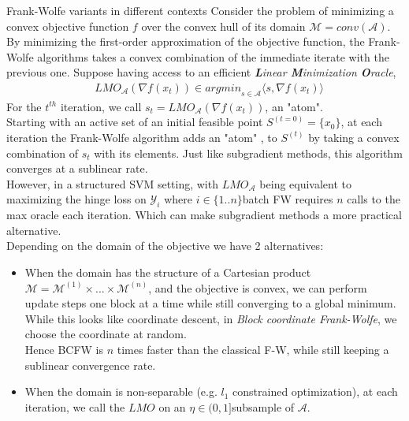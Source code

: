 \documentclass[final]{beamer}
\newlength{\colwidth}
\begin{document}
\begin{frame}[t]
\begin{columns}[t]
\begin{column}{\colwidth}
  \begin{block}{Frank-Wolfe variants in different contexts}
    Consider the problem of minimizing a convex objective function $f$ over the convex hull of its domain $\mathcal{M}= conv(\mathcal{A})$.\\
    By minimizing the first-order approximation of the objective function, the Frank-Wolfe algorithms takes a convex combination of the immediate iterate with the previous one. Suppose having access to an efficient \textit{\textbf{L}inear \textbf{M}inimization \textbf{O}racle},
    \begin{equation*}
    \begin{aligned}
        &LMO_{\mathcal{A}}(\nabla f(x_{t}))\in \textit{argmin}_{s\in\mathcal{A}}\langle s, \nabla f(x_{t})\rangle
    \end{aligned}    
    \end{equation*}
    For the $t^{th}$ iteration, we call $s_{t}= LMO_{\mathcal{A}}(\nabla f(x_{t}))$, an "atom".\\
    Starting with an active set of an initial feasible point $S^{(t=0)}= \{x_{0}\}$, at each iteration the Frank-Wolfe algorithm adds an "atom" , to $S^{(t)}$ by taking a convex combination of $s_{t}$ with its elements. Just like subgradient methods, this algorithm converges at a sublinear rate.\\
    However, in a structured SVM setting, with $LMO_{\mathcal{A}}$ being equivalent to maximizing the hinge loss on $\mathcal{Y}_{i}$ where $i\in\{1..n\}$\quad batch FW requires $n$ calls to the max oracle each iteration. Which can make subgradient methods a more practical alternative.\\
    Depending on the domain of the objective we have 2 alternatives:
    \begin{itemize}
      \item When the domain has the structure of a Cartesian product $\mathcal{M}=\mathcal{M}^{(1)}\times...\times\mathcal{M}^{(n)}$, and the objective is convex, we can perform update steps one block at a time while still converging to a global minimum.\\
     While this looks like coordinate descent, in \textit{Block coordinate Frank-Wolfe}, we choose the coordinate at random.\\
     Hence BCFW is $n$ times faster than the classical F-W, while still keeping a sublinear convergence rate.
      \item When the domain is non-separable (e.g. $l_{1}$ constrained optimization), at each iteration, we call the $LMO$ on an $\eta\in(0,1]$\quad subsample of $\mathcal{A}$.\\

\end{itemize}
\end{block}
\end{column}
\end{columns}
\end{frame}
\end{document}

